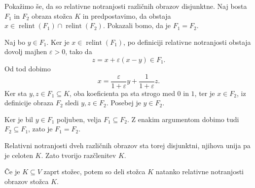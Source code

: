 \documentclass[mat2, tisk]{fmfdelo}
\begin{document}
\begin{dokaz}
Pokažimo še, da so relativne notranjosti različnih obrazov
disjunktne. Naj bosta $F_1$ in $F_2$ obraza stožca $K$ in
predpostavimo, da obstaja
$x\in\operatorname{relint}(F_1)
\cap\operatorname{relint}(F_2)$.
Pokazali bomo, da je $F_1=F_2$.

Naj bo $y\in F_1$. Ker je
$x\in\operatorname{relint}(F_1)$, po definiciji relativne notranjosti obstaja dovolj majhen
$\varepsilon>0$, tako da
\[
z=x+\varepsilon(x-y)\in F_1.
\]
Od tod dobimo
\[
x=
\frac{\varepsilon}{1+\varepsilon}y+
\frac{1}{1+\varepsilon}z.
\]
Ker sta $y,z\in F_1\subseteq K$, oba koeficienta pa sta strogo med
$0$ in $1$, ter je $x\in F_2$, iz definicije obraza $F_2$ sledi
$y,z\in F_2$. Posebej je $y\in F_2$.

Ker je bil $y\in F_1$ poljuben, velja $F_1\subseteq F_2$.
Z enakim argumentom dobimo tudi $F_2\subseteq F_1$, zato je
$F_1=F_2$.

Relativni notranjosti dveh različnih obrazov sta torej disjunktni,
njihova unija pa je celoten $K$. Zato tvorijo razčlenitev $K$.
\end{dokaz}


\begin{lema}\label{lema:deli_stozca}  
Če je $K \subseteq V$ zaprt stožec, potem so deli stožca $K$ natanko relativne notranjosti obrazov stožca $K$.
\end{lema}
\end{document}
